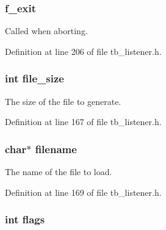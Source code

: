 \hypertarget{structtb__listener__t_a90a87c6e5bc8d9e690190da6d0aa926e}{
\subsubsection[{f\-\_\-exit}]{ f\-\_\-exit}}\label{structtb__listener__t_a90a87c6e5bc8d9e690190da6d0aa926e}


Called when aborting. 



Definition at line 206 of file tb\-\_\-listener.\-h.

\hypertarget{structtb__listener__t_a8bc95708c758a6400d8692f2d0fcbaeb}{
\subsubsection[{file\-\_\-size}]{\setlength{\rightskip}{0pt plus 5cm}int file\-\_\-size}}\label{structtb__listener__t_a8bc95708c758a6400d8692f2d0fcbaeb}


The size of the file to generate. 



Definition at line 167 of file tb\-\_\-listener.\-h.

\hypertarget{structtb__listener__t_aeac90097f29f7529968697163cea5c18}{
\subsubsection[{filename}]{\setlength{\rightskip}{0pt plus 5cm}char$\ast$ filename}}\label{structtb__listener__t_aeac90097f29f7529968697163cea5c18}


The name of the file to load. 



Definition at line 169 of file tb\-\_\-listener.\-h.

\hypertarget{structtb__listener__t_ac8bf36fe0577cba66bccda3a6f7e80a4}{
\subsubsection[{flags}]{\setlength{\rightskip}{0pt plus 5cm}int flags}}\label{structtb__listener__t_ac8bf36fe0577cba66bccda3a6f7e80a4}



